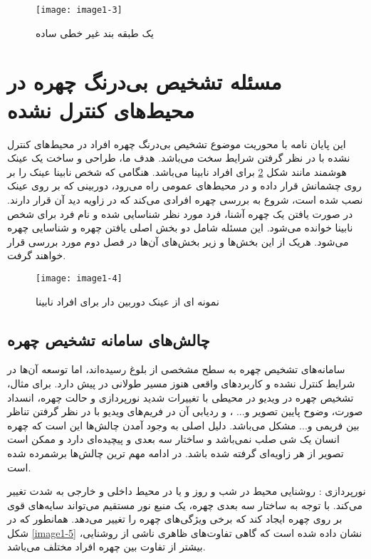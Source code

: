 \begin{figure}[h]
\centering
\texttt{[image: image1-3]}
\caption{ یک طبقه بند غیر خطی ساده }
\label{image1-3}
\end{figure}

\section{مسئله تشخیص بی‌درنگ چهره در محیط‌های کنترل نشده}
این پایان نامه با محوریت موضوع تشخیص بی‌درنگ چهره افراد در محیط‌های کنترل نشده با در نظر گرفتن شرایط سخت می‌باشد. هدف ما، طراحی و ساخت یک عینک هوشمند مانند شکل \ref{image1-4} برای افراد نابینا می‌باشد. هنگامی که شخص نابینا عینک را بر روی چشمانش قرار داده و در محیط‌های عمومی راه می‌رود، دوربینی که بر روی عینک نصب شده است، شروع به بررسی چهره افرادی می‌کند که در زاویه دید آن قرار دارند. در صورت یافتن یک چهره آشنا، فرد مورد نظر شناسایی شده و نام فرد برای شخص نابینا خوانده می‌شود. این مسئله شامل دو بخش اصلی یافتن چهره و شناسایی چهره می‌شود. هریک از این بخش‌ها و زیر بخش‌های آن‌ها در فصل دوم مورد بررسی قرار خواهند گرفت.

\begin{figure}[!h]
\centering
\texttt{[image: image1-4]}
\caption{نمونه ای از عینک دوربین دار برای افراد نابینا \cite{Glasses}}
\label{image1-4}
\end{figure}

\subsection{چالش‌های سامانه تشخیص چهره}
سامانه‌های تشخیص چهره به سطح مشخصی از بلوغ رسیده‌اند، اما توسعه آن‌ها در شرایط کنترل نشده و کاربردهای واقعی هنوز مسیر طولانی در پیش دارد. برای مثال، تشخیص چهره در ویدیو در محیطی با تغییرات شدید نورپردازی و حالت چهره، انسداد صورت، وضوح پایین تصویر و... ، و ردیابی آن در فریم‌های ویدیو با در نظر گرفتن تناظر بین فریمی و... مشکل می‌باشد. دلیل اصلی به وجود آمدن چالش‌ها این است که چهره انسان یک شی صلب نمی‌باشد و ساختار سه بعدی و پیچیده‌ای دارد و ممکن است تصویر از هر زاویه‌ای گرفته شده باشد. در ادامه مهم ترین چالش‌ها برشمرده شده است.

\noindent
نورپردازی : روشنایی محیط در شب و روز و یا در محیط داخلی و خارجی به شدت تغییر می‌کند. با توجه به ساختار سه بعدی چهره، یک منبع نور مستقیم می‌تواند سایه‌های قوی بر روی چهره ایجاد کند که برخی ویژگی‌های چهره را تغییر می‌دهد. همانطور که در شکل \ref{image1-5} نشان داده شده است که گاهی تفاوت‌های ظاهری ناشی از روشنایی، بیشتر از تفاوت بین چهره افراد مختلف می‌باشد.

